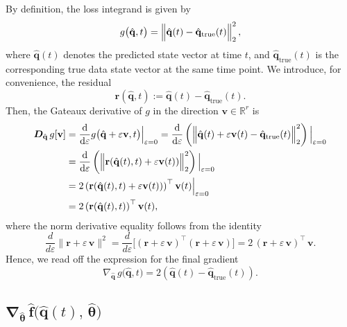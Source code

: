 By definition, the loss integrand is given by\\
$$g\bigl(\hat{\mathbf{q}},t\bigr)= \Bigl\|\hat{\mathbf{q}}(t) - \hat{\mathbf{q}}_{\mathrm{true}}(t)\Bigr\|_2^2\,,$$
where $\hat{\mathbf{q}}(t)$ denotes the predicted state vector at time $t$, and $\hat{\mathbf{q}}_{\text{true}}(t)$ is the corresponding true data state vector at the same time point.
We introduce, for convenience, the residual\\
$$\mathbf{r}(\hat{\mathbf{q}},t):=  \hat{\mathbf{q}}(t) - \hat{\mathbf{q}}_{\mathrm{true}}(t).$$
Then, the Gateaux derivative of $g$ in the direction $\mathbf{v}\in\mathbb{R}^r$ is\\
\begin{align*}
\label{eq:gradient_3}
\bm{D}_{\hat{\mathbf{q}}}\,g[\mathbf{v}]
&=\frac{\mathrm{d}}{\mathrm{d}\varepsilon}
g\bigl(\hat{\mathbf{q}}+\varepsilon\mathbf{v},t\bigr)\Big|_{\varepsilon=0}=
\frac{\mathrm{d}}{\mathrm{d}\varepsilon}\left( \Bigl\|\hat{\mathbf{q}}(t) + \varepsilon\mathbf{v}(t) - \hat{\mathbf{q}}_{\mathrm{true}}(t)\Bigr\|_2^2\right) \Big|_{\varepsilon=0}\\
 &= \frac{\mathrm{d}}{\mathrm{d}\varepsilon}\left( \Bigl\|\mathbf{r}(\hat{\mathbf{q}}(t),t) + \varepsilon\mathbf{v}(t))\Bigr\|_2^2\right) \Big|_{\varepsilon=0}\\
 &= 2\left(\mathbf{r}(\hat{\mathbf{q}}(t),t) + \varepsilon\mathbf{v}(t))\right)^{\top}\mathbf{v}(t) \Big|_{\varepsilon=0}\\
 &= 2\left(\mathbf{r}(\hat{\mathbf{q}}(t),t)\right)^{\top}\mathbf{v}(t),
\end{align*}
where the norm derivative equality follows from the identity\\
$$\frac{d}{d\varepsilon}\|\mathbf{r} + \varepsilon\,\mathbf{v}\|^2
= \frac{d}{d\varepsilon}\bigl[(\mathbf{r} + \varepsilon\,\mathbf{v})^\top (\mathbf{r} + \varepsilon\,\mathbf{v})\bigr]= 2\,(\mathbf{r} + \varepsilon\,\mathbf{v})^\top\,\mathbf{v}.$$
Hence, we read off the expression for the final gradient\\
\begin{equation}
\label{eq:gradient_3}
\nabla_{\hat{\mathbf{q}}}\,g\bigl(\hat{\mathbf{q}},t\bigr) = 2\left(\hat{\mathbf{q}}(t) - \hat{\mathbf{q}}_{\mathrm{true}}(t)\right).
\end{equation}

\subsection{$\bm{\nabla}_{\hat{\bm{\theta}}}\,\hat{\mathbf{f}}\bigl(\hat{\mathbf{q}}(t),\,\hat{\bm{\theta}}\bigr)$}

